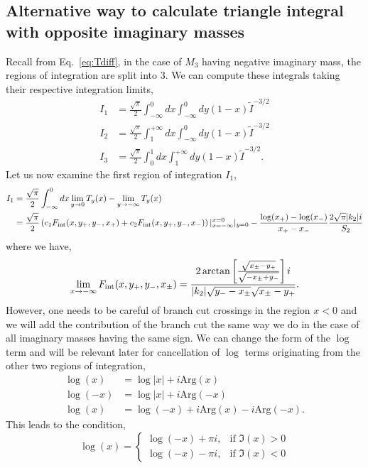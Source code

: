 \documentclass[twoside]{article}
\begin{document}
\subsection{Alternative way to calculate triangle integral with opposite imaginary masses}
Recall from Eq.~\eqref{eq:Tdiff}, in the case of $M_3$ having negative imaginary mass, the regions of integration are split into 3. We can
compute these integrals taking their respective integration limits,
\begin{align}
  I_1 &=  \frac{\sqrt{\pi}}{2}\int^0_{-\infty}dx\int^0_{-\infty}dy(1-x)\tilde{I}^{-3/2}\\
  I_2 &= \frac{\sqrt{\pi}}{2}\int^{+\infty}_{1}dx\int^0_{-\infty}dy(1-x)\tilde{I}^{-3/2}\\
  I_3 &= \frac{\sqrt{\pi}}{2}\int^1_0dx\int^{+\infty}_{1}dy(1-x)\tilde{I}^{-3/2}.
\end{align}
Let us now examine the first region of integration $I_1$,
\begin{align}
  \label{eq:I1}
I_1 &= \frac{\sqrt{\pi}}{2}\int^0_{-\infty}dx \lim_{y \rightarrow 0}T_y(x) - \lim_{y \rightarrow -\infty}T_y(x)\\
&= \frac{\sqrt{\pi}}{2}\left( c_1 F_{\rm int}(x, y_+, y_-, x_+) + c_2 F_{\rm int}(x, y_+, y_-, x_-)\right)\vert^{x = 0}_{x =
-\infty}\vert_{y = 0} - \frac{\log(x_+) - \log(x_-)}{x_+ -  x_-}\frac{2\sqrt{\pi}|k_2|i}{S_2}
\end{align}
where we have,
\begin{align}
  \lim_{x \rightarrow -\infty}F_{\rm int}(x, y_+, y_-, x_{\pm}) = \frac{2 \arctan\left[ \frac{\sqrt{x_{\pm} - y_+}}{\sqrt{-x_{\pm} + y_-}}
  \right]i}{|k_2|\sqrt{y_- - x_{\pm}}\sqrt{x_{\pm} - y_+}}.
\end{align}
However, one needs to be careful of branch cut crossings in the region $x < 0$ and we will add the contribution of the branch cut the same
way we do in the case of all imaginary masses having the same sign. We can change the form of the $\log$ term and will be relevant later for
cancellation of $\log$ terms originating from the other two regions of integration,
\begin{align}
  \log(x) &=  \log|x| + i \textrm{Arg} (x) \\
  \log(-x) &= \log|x| + i \textrm{Arg} (-x) \\
  \log(x) &= \log(-x) + i \textrm{Arg} (x) - i\textrm{Arg} (-x).
\end{align}
This leads to the condition,
\[
  \log(x) = 
  \begin{cases}
    \log(-x) + \pi i, & \text{if } \Im(x) > 0\\
    \log(-x) - \pi i, & \text{if } \Im(x) < 0
  \end{cases}
\]
\end{document}
